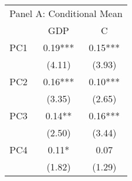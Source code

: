 \begingroup
\fontsize{12.0pt}{14.4pt}\selectfont
\begin{tabular}{lcc}
\toprule
\multicolumn{3}{c}{Panel A: Conditional Mean} \\ 
\cmidrule(lr){1-3}
  & GDP & C \\ 
\midrule\addlinespace[2.5pt]
PC1 & 0.19*** & 0.15*** \\ 
 & (4.11) & (3.93) \\ 
PC2 & 0.16*** & 0.10*** \\ 
 & (3.35) & (2.65) \\ 
PC3 & 0.14** & 0.16*** \\ 
 & (2.50) & (3.44) \\ 
PC4 & 0.11* & 0.07 \\ 
 & (1.82) & (1.29) \\ 
\bottomrule
\end{tabular}
\endgroup

